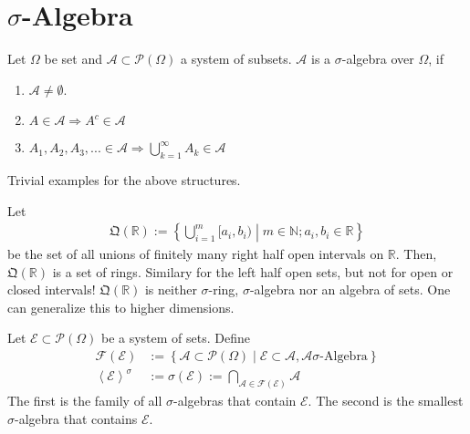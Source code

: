 \section{\(\sigma\)-Algebra}
\begin{definition}
    Let \(\Omega\) be set and \(\mathcal{A} \subset \mathcal{P}(\Omega)\) a system of subsets. \(\mathcal{A}\) is a \(\sigma\)-algebra over \(\Omega\), if
        \begin{enumerate}
            \item \(\mathcal{A} \neq \emptyset\).
            \item \(A \in \mathcal{A} \Rightarrow A^c \in \mathcal{A}\)
            \item \(A_1, A_2, A_3, ... \in \mathcal{A} \Rightarrow \bigcup_{k=1}^\infty A_k \in \mathcal{A}\)
        \end{enumerate}
\end{definition}
\begin{example}
    Trivial examples for the above structures.
\end{example}
\begin{example}
    Let
    \begin{align}
        \mathfrak{Q}(\mathbb{R}) := \left\{ \bigcup_{i=1}^m [a_i, b_i)  \middle| m \in \mathbb{N}; a_i, b_i \in \mathbb{R} \right\}
    \end{align}
    be the set of all unions of finitely many right half open intervals on \(\mathbb{R}\). Then, \(\mathfrak{Q}(\mathbb{R})\) is a set of rings. Similary for the left half open sets, but not for open or closed intervals!
    \(\mathfrak{Q}(\mathbb{R})\) is neither \(\sigma\)-ring, \(\sigma\)-algebra nor an algebra of sets.
    One can generalize this to higher dimensions.
\end{example}
\begin{definition}
    Let \(\mathcal{E} \subset \mathcal{P}(\Omega)\) be a system of sets. Define
    \begin{align}
        \mathcal{F}(\mathcal{E}) &:= \left\{ \mathcal{A} \subset \mathcal{P}(\Omega) \middle| \mathcal{E} \subset \mathcal{A}, \mathcal{A} \sigma\text{-Algebra} \right\} \\
        \left< \mathcal{E}  \right>^{\sigma} &:= \sigma(\mathcal{E}) := \bigcap_{\mathcal{A} \in \mathcal{F}(\mathcal{E})} \mathcal{A}
    \end{align}
    The first is the family of all \(\sigma\)-algebras that contain \(\mathcal{E}\).
    The second is the smallest \(\sigma\)-algebra that contains \(\mathcal{E}\).
\end{definition}
%
%
%
%
%
